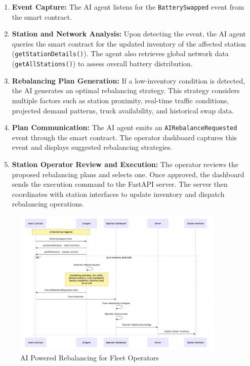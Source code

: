 \documentclass[12pt,a4paper]{article}
\begin{document}
\begin{enumerate}[label=\textbf{Step \arabic*:}, wide=0pt, leftmargin=*]
    \item \textbf{Event Capture:}  
    The AI agent listens for the \texttt{BatterySwapped} event from the smart contract.

    \item \textbf{Station and Network Analysis:}  
    Upon detecting the event, the AI agent queries the smart contract for the updated inventory of the affected station (\texttt{getStationDetails()}).  
    The agent also retrieves global network data (\texttt{getAllStations()}) to assess overall battery distribution.

    \item \textbf{Rebalancing Plan Generation:}  
    If a low-inventory condition is detected, the AI generates an optimal rebalancing strategy.  
    This strategy considers multiple factors such as station proximity, real-time traffic conditions, projected demand patterns, truck availability, and historical swap data.

    \item \textbf{Plan Communication:}  
    The AI agent emits an \texttt{AIRebalanceRequested} event through the smart contract.  
    The operator dashboard captures this event and displays suggested rebalancing strategies.

    \item \textbf{Station Operator Review and Execution:}  
    The operator reviews the proposed rebalancing plans and selects one.  
    Once approved, the dashboard sends the execution command to the FastAPI server.  
    The server then coordinates with station interfaces to update inventory and dispatch rebalancing operations.
\end{enumerate}

\noindent
\begin{figure}[H]
    \centering
    \includegraphics[width=0.9\textwidth]{diagram2.png}
    \caption{AI Powered Rebalancing for Fleet Operators}
\end{figure}
\end{document}

